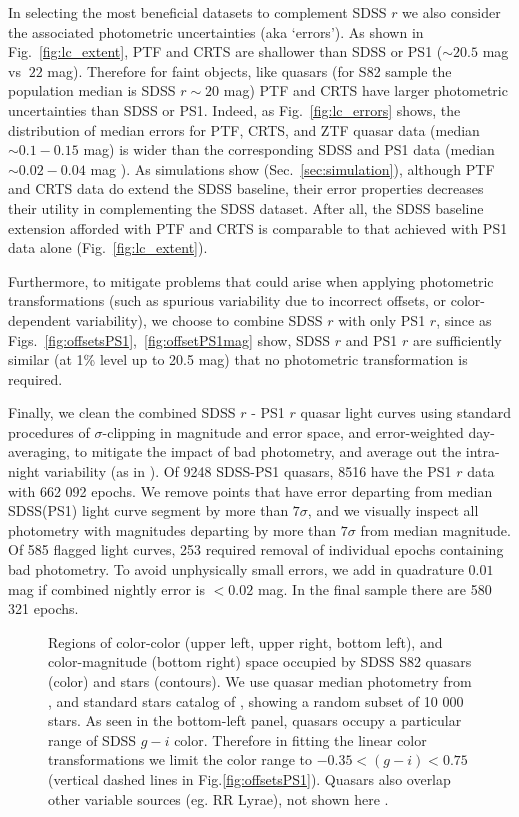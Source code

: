 \documentclass[twocolumn]{aastex62}
\begin{document}
In selecting the most beneficial datasets to complement SDSS $r$ we also consider the associated photometric uncertainties (aka `errors'). As shown in Fig.~\ref{fig:lc_extent},  PTF and CRTS are shallower than SDSS or PS1 ($\sim20.5$ mag vs $~22$ mag). Therefore for faint objects, like quasars (for S82 sample the population median is SDSS $r \sim 20$ mag) PTF and CRTS have larger photometric uncertainties than SDSS or PS1. Indeed, as Fig.~\ref{fig:lc_errors} shows, the distribution of median errors for PTF, CRTS, and ZTF quasar data (median $\sim0.1-0.15$ mag) is wider than the corresponding SDSS and PS1 data (median $\sim0.02-0.04$ mag ). As simulations show (Sec.~\ref{sec:simulation}), although PTF and CRTS data do extend the SDSS baseline, their error properties decreases their utility in complementing the SDSS dataset. After all, the SDSS baseline extension afforded with PTF and CRTS is comparable to that achieved with PS1 data alone (Fig.~\ref{fig:lc_extent}). 

Furthermore, to mitigate problems that could arise when applying photometric transformations (such as spurious variability due to incorrect offsets, or color-dependent variability), we choose to combine SDSS $r$ with only PS1 $r$, since as Figs.~\ref{fig:offsetsPS1},~\ref{fig:offsetPS1mag} show, SDSS $r$ and PS1 $r$ are sufficiently similar (at 1\% level up to 20.5 mag) that no photometric transformation is required. 

Finally, we clean the combined SDSS $r$ - PS1 $r$ quasar light curves using standard procedures of  $\sigma$-clipping in magnitude and error space, and error-weighted day-averaging, to mitigate the impact of bad photometry, and average out the intra-night variability (as in \citealt{charisi2016,suberlak2017}). Of 9248 SDSS-PS1 quasars, 8516 have the PS1 $r$ data with 662 092 epochs.  We remove points that have error departing from median SDSS(PS1) light curve segment by more than $7 \sigma$, and we visually inspect all photometry with magnitudes departing by more than  $7\sigma$ from median magnitude. Of 585 flagged light curves, 253 required removal of individual epochs containing bad photometry. To avoid unphysically small errors,  we add in quadrature $0.01$ mag if combined nightly error is $<0.02$ mag. In the final sample there are 580 321 epochs. 


\begin{figure*} 
	\caption{Regions of color-color (upper left, upper right, bottom left), and color-magnitude (bottom right)  space occupied by SDSS S82 quasars (color) and stars (contours). We use quasar median photometry from \citet{schneider2010}, and standard stars catalog of \citet{ivezic2007}, showing a random subset of 10 000 stars. As seen in the bottom-left panel, quasars occupy a particular range of SDSS $g-i$ color. Therefore in fitting the linear color transformations we limit the color range to  $-0.35<(g-i)<0.75$ (vertical dashed lines in Fig.\ref{fig:offsetsPS1}). Quasars also overlap other variable sources (eg. RR Lyrae), not shown here \citep{sesar2007}. }
	\label{fig:quasarColors}
\end{figure*} 
\end{document}
